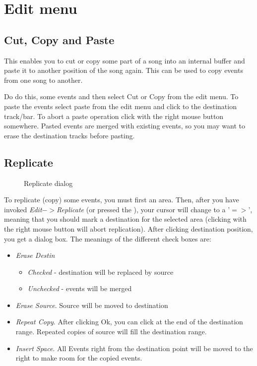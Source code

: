 \documentclass[letterpaper]{report}
\begin{document}
\section{Edit menu}\label{twedit}


\subsection{Cut, Copy and Paste}\label{twclip}

This enables you to cut or copy some part of a song into an internal buffer
and paste it to another position of the song again. This can be used to
copy events from one song to another.

Do do this,  some events and then select Cut or
Copy from the edit menu. To paste the events select paste from the edit menu
and click to the destination track/bar. To abort a paste operation click with
the right mouse button somewhere. Pasted events are merged with existing
events, so you may want to erase the destination tracks before pasting.



\subsection{Replicate}\label{replicate}

\begin{figure}%
%
%
\caption{Replicate dialog}%
\end{figure}

To replicate (copy) some events, you must first 
an area. Then, after you have invoked {\em Edit$->$Replicate} (or
pressed the ), your cursor will change to
a '$=>$', meaning that you should mark a
destination for the selected area (clicking with the right mouse button will
abort replication). After clicking destination position, you get a dialog
box. The meanings of the different check boxes are:

\begin{itemize}
\item {\em Erase Destin}

\begin{itemize}
\item {\em Checked} - destination will be replaced by source
\item {\em Unchecked} - events will be merged
\end{itemize}

\item {\em Erase Source}. Source will be moved to destination

\item {\em Repeat Copy}. After clicking Ok, you can click at the end of the
destination range. Repeated copies of source will fill the destination range.

\item {\em Insert Space}. All Events right from the destination point will
be moved to the right to make room for the copied events.

\end{itemize}
\end{document}
